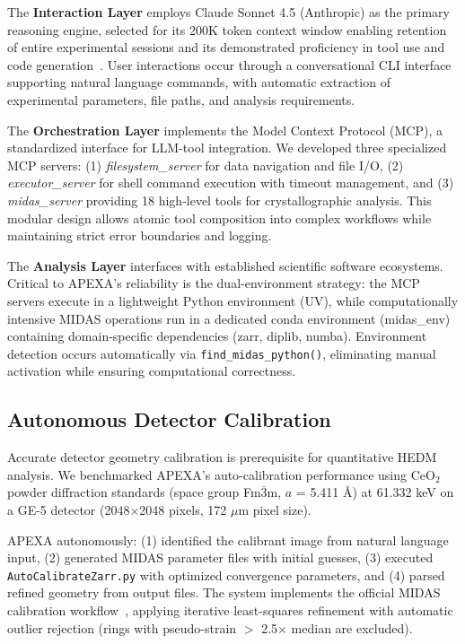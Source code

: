 \documentclass[11pt]{article}
\begin{document}
The \textbf{Interaction Layer} employs Claude Sonnet 4.5 (Anthropic) as the primary reasoning engine, selected for its 200K token context window enabling retention of entire experimental sessions and its demonstrated proficiency in tool use and code generation~\cite{anthropic2024claude}. User interactions occur through a conversational CLI interface supporting natural language commands, with automatic extraction of experimental parameters, file paths, and analysis requirements.

The \textbf{Orchestration Layer} implements the Model Context Protocol (MCP), a standardized interface for LLM-tool integration. We developed three specialized MCP servers: (1) \textit{filesystem\_server} for data navigation and file I/O, (2) \textit{executor\_server} for shell command execution with timeout management, and (3) \textit{midas\_server} providing 18 high-level tools for crystallographic analysis. This modular design allows atomic tool composition into complex workflows while maintaining strict error boundaries and logging.

The \textbf{Analysis Layer} interfaces with established scientific software ecosystems. Critical to APEXA's reliability is the dual-environment strategy: the MCP servers execute in a lightweight Python environment (UV), while computationally intensive MIDAS operations run in a dedicated conda environment (midas\_env) containing domain-specific dependencies (zarr, diplib, numba). Environment detection occurs automatically via \texttt{find\_midas\_python()}, eliminating manual activation while ensuring computational correctness.

\subsection{Autonomous Detector Calibration}

Accurate detector geometry calibration is prerequisite for quantitative HEDM analysis. We benchmarked APEXA's auto-calibration performance using CeO$_2$ powder diffraction standards (space group Fm$\overline{3}$m, $a$ = 5.411 Å) at 61.332 keV on a GE-5 detector (2048$\times$2048 pixels, 172 $\mu$m pixel size).

APEXA autonomously: (1) identified the calibrant image from natural language input, (2) generated MIDAS parameter files with initial guesses, (3) executed \texttt{AutoCalibrateZarr.py} with optimized convergence parameters, and (4) parsed refined geometry from output files. The system implements the official MIDAS calibration workflow~\cite{sharma2012new}, applying iterative least-squares refinement with automatic outlier rejection (rings with pseudo-strain $>$ 2.5$\times$ median are excluded).
\end{document}
